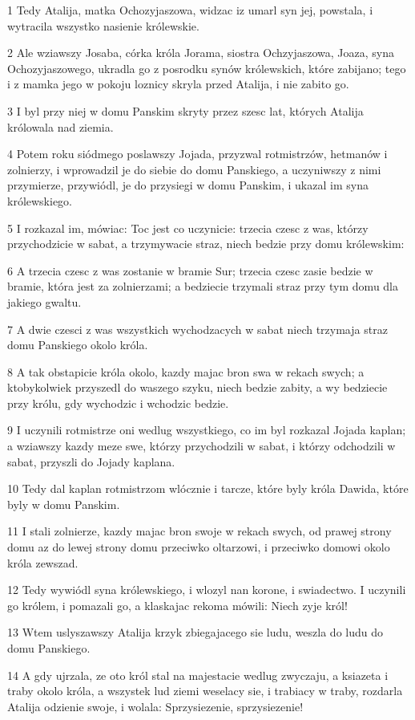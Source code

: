 \par 1 Tedy Atalija, matka Ochozyjaszowa, widzac iz umarl syn jej, powstala, i wytracila wszystko nasienie królewskie.
\par 2 Ale wziawszy Josaba, córka króla Jorama, siostra Ochzyjaszowa, Joaza, syna Ochozyjaszowego, ukradla go z posrodku synów królewskich, które zabijano; tego i z mamka jego w pokoju loznicy skryla przed Atalija, i nie zabito go.
\par 3 I byl przy niej w domu Panskim skryty przez szesc lat, których Atalija królowala nad ziemia.
\par 4 Potem roku siódmego poslawszy Jojada, przyzwal rotmistrzów, hetmanów i zolnierzy, i wprowadzil je do siebie do domu Panskiego, a uczyniwszy z nimi przymierze, przywiódl, je do przysiegi w domu Panskim, i ukazal im syna królewskiego.
\par 5 I rozkazal im, mówiac: Toc jest co uczynicie: trzecia czesc z was, którzy przychodzicie w sabat, a trzymywacie straz, niech bedzie przy domu królewskim:
\par 6 A trzecia czesc z was zostanie w bramie Sur; trzecia czesc zasie bedzie w bramie, która jest za zolnierzami; a bedziecie trzymali straz przy tym domu dla jakiego gwaltu.
\par 7 A dwie czesci z was wszystkich wychodzacych w sabat niech trzymaja straz domu Panskiego okolo króla.
\par 8 A tak obstapicie króla okolo, kazdy majac bron swa w rekach swych; a ktobykolwiek przyszedl do waszego szyku, niech bedzie zabity, a wy bedziecie przy królu, gdy wychodzic i wchodzic bedzie.
\par 9 I uczynili rotmistrze oni wedlug wszystkiego, co im byl rozkazal Jojada kaplan; a wziawszy kazdy meze swe, którzy przychodzili w sabat, i którzy odchodzili w sabat, przyszli do Jojady kaplana.
\par 10 Tedy dal kaplan rotmistrzom wlócznie i tarcze, które byly króla Dawida, które byly w domu Panskim.
\par 11 I stali zolnierze, kazdy majac bron swoje w rekach swych, od prawej strony domu az do lewej strony domu przeciwko oltarzowi, i przeciwko domowi okolo króla zewszad.
\par 12 Tedy wywiódl syna królewskiego, i wlozyl nan korone, i swiadectwo. I uczynili go królem, i pomazali go, a klaskajac rekoma mówili: Niech zyje król!
\par 13 Wtem uslyszawszy Atalija krzyk zbiegajacego sie ludu, weszla do ludu do domu Panskiego.
\par 14 A gdy ujrzala, ze oto król stal na majestacie wedlug zwyczaju, a ksiazeta i traby okolo króla, a wszystek lud ziemi weselacy sie, i trabiacy w traby, rozdarla Atalija odzienie swoje, i wolala: Sprzysiezenie, sprzysiezenie!
